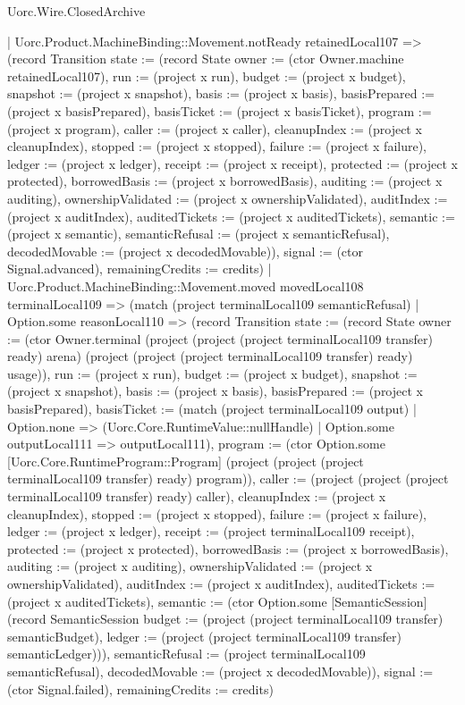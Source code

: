 \begin{lexlean}{Uorc.Wire.ClosedArchive}
\begin{semanticmodule}
{      | Uorc.Product.MachineBinding::Movement.notReady retainedLocal107 => (record Transition {state := (record State {owner := (ctor Owner.machine retainedLocal107), run := (project x run), budget := (project x budget), snapshot := (project x snapshot), basis := (project x basis), basisPrepared := (project x basisPrepared), basisTicket := (project x basisTicket), program := (project x program), caller := (project x caller), cleanupIndex := (project x cleanupIndex), stopped := (project x stopped), failure := (project x failure), ledger := (project x ledger), receipt := (project x receipt), protected := (project x protected), borrowedBasis := (project x borrowedBasis), auditing := (project x auditing), ownershipValidated := (project x ownershipValidated), auditIndex := (project x auditIndex), auditedTickets := (project x auditedTickets), semantic := (project x semantic), semanticRefusal := (project x semanticRefusal), decodedMovable := (project x decodedMovable)}), signal := (ctor Signal.advanced), remainingCredits := credits})
      | Uorc.Product.MachineBinding::Movement.moved movedLocal108 terminalLocal109 => (match (project terminalLocal109 semanticRefusal)
        | Option.some reasonLocal110 => (record Transition {state := (record State {owner := (ctor Owner.terminal (project (project (project terminalLocal109 transfer) ready) arena) (project (project (project terminalLocal109 transfer) ready) usage)), run := (project x run), budget := (project x budget), snapshot := (project x snapshot), basis := (project x basis), basisPrepared := (project x basisPrepared), basisTicket := (match (project terminalLocal109 output)
          | Option.none => (Uorc.Core.RuntimeValue::nullHandle)
          | Option.some outputLocal111 => outputLocal111), program := (ctor Option.some [Uorc.Core.RuntimeProgram::Program] (project (project (project terminalLocal109 transfer) ready) program)), caller := (project (project (project terminalLocal109 transfer) ready) caller), cleanupIndex := (project x cleanupIndex), stopped := (project x stopped), failure := (project x failure), ledger := (project x ledger), receipt := (project terminalLocal109 receipt), protected := (project x protected), borrowedBasis := (project x borrowedBasis), auditing := (project x auditing), ownershipValidated := (project x ownershipValidated), auditIndex := (project x auditIndex), auditedTickets := (project x auditedTickets), semantic := (ctor Option.some [SemanticSession] (record SemanticSession {budget := (project (project terminalLocal109 transfer) semanticBudget), ledger := (project (project terminalLocal109 transfer) semanticLedger)})), semanticRefusal := (project terminalLocal109 semanticRefusal), decodedMovable := (project x decodedMovable)}), signal := (ctor Signal.failed), remainingCredits := credits})
}
\end{semanticmodule}
\end{lexlean}
